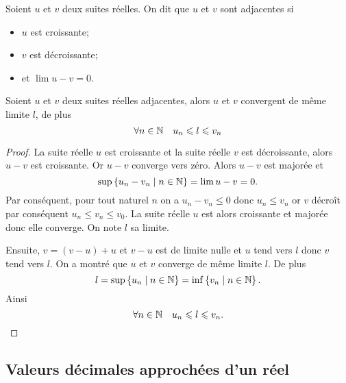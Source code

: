 \begin{defdef}
  Soient \(u\) et \(v\) deux suites réelles. On dit que \(u\) et \(v\) sont adjacentes si
  \begin{itemize}
  \item \(u\) est croissante;
  \item \(v\) est décroissante;
  \item et \(\lim u-v =0\).
  \end{itemize}
\end{defdef}
\begin{prop}
  Soient \(u\) et \(v\) deux suites réelles adjacentes, alors \(u\) et \(v\) convergent de même limite \(l\), de plus
  \begin{equation}
    \forall n \in \mathbb{N} \quad u_n \leqslant l \leqslant v_n
  \end{equation}
\end{prop}
\begin{proof}
  La suite réelle \(u\) est croissante et la suite réelle \(v\) est décroissante, alors \(u-v\) est croissante. Or \(u-v\) converge vers zéro. Alors \(u-v\) est majorée et
  \begin{equation}
    \sup\left\{u_n-v_n\mathrel{}\middle|\mathrel{}n \in \mathbb{N}\right\}=\lim u-v=0.
  \end{equation}
Par conséquent, pour tout naturel \(n\) on a \(u_n-v_n \leqslant 0\) donc \(u_n \leqslant v_n\) or \(v\) décroît par conséquent \(u_n \leqslant v_n \leqslant v_0\). La suite réelle \(u\) est alors croissante et majorée donc elle converge. On note \(l\) sa limite. 

Ensuite, \(v=(v-u)+u\) et \(v-u\) est de limite nulle et \(u\) tend vers \(l\) donc \(v\) tend vers \(l\). On a montré que \(u\) et \(v\) converge de même limite \(l\). De plus
\begin{equation}
  l=\sup\left\{u_n\mathrel{}\middle|\mathrel{}n\in \mathbb{N}\right\}=\inf\left\{v_n\mathrel{}\middle|\mathrel{}n\in \mathbb{N}\right\}.
\end{equation}
Ainsi
\begin{equation}
  \forall n \in \mathbb{N} \quad u_n \leqslant l \leqslant v_n.
\end{equation}
\end{proof}

\subsection{Valeurs décimales approchées d'un réel}

